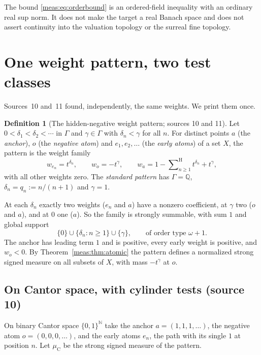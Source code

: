 \documentclass[11pt]{article}
\numberwithin{equation}{section}
\theoremstyle{definition}
\newtheorem{definition}[theorem]{Definition}
\theoremstyle{remark}
\newcommand{\Q}{\mathbb Q}
\newcommand{\N}{\mathbb N}
\newcommand{\hsum}{\mathop{\sum}\nolimits^{\mathrm H}}
\begin{document}
The bound \eqref{meas:eq:orderbound} is an ordered-field inequality with an
ordinary real sup norm. It does not make the target a real Banach space and does
not assert continuity into the valuation topology or the surreal fine
topology.

\section{One weight pattern, two test classes}\label{meas:sec:pattern}

Sources~10 and~11 found, independently, the same weights. We print them once.

\begin{definition}[The hidden-negative weight pattern; sources 10 and 11]
\label{meas:def:pattern}
Let $0<\delta_1<\delta_2<\cdots$ in $\Gamma$ and $\gamma\in\Gamma$ with
$\delta_n<\gamma$ for all $n$. For distinct points $a$ (the \emph{anchor}), $o$
(the \emph{negative atom}) and $e_1,e_2,\ldots$ (the \emph{early atoms}) of a set
$X$, the pattern is the weight family
\begin{equation}\label{meas:eq:pattern}
 w_{e_n}=t^{\delta_n},\qquad w_o=-t^\gamma,\qquad
 w_a=1-\hsum_{n\ge1}t^{\delta_n}+t^\gamma,
\end{equation}
with all other weights zero. The \emph{standard pattern} has $\Gamma=\Q$,
$\delta_n=q_n:=n/(n+1)$ and $\gamma=1$.
\end{definition}

At each $\delta_n$ exactly two weights ($e_n$ and $a$) have a nonzero
coefficient, at $\gamma$ two ($o$ and $a$), and at $0$ one ($a$). So the family is
strongly summable, with sum $1$ and global support
\[
 \{0\}\cup\{\delta_n:n\ge1\}\cup\{\gamma\},\qquad\text{of order type }\omega+1.
\]
The anchor has leading term $1$ and is positive, every early weight is positive,
and $w_o<0$. By Theorem~\ref{meas:thm:atomic} the pattern defines a normalized
strong signed measure on all subsets of $X$, with mass $-t^\gamma$ at $o$.

\subsection{On Cantor space, with cylinder tests (source 10)}

On binary Cantor space $\{0,1\}^{\N}$ take the anchor $a=(1,1,1,\ldots)$, the
negative atom $o=(0,0,0,\ldots)$, and the early atoms $e_n$, the path with its
single $1$ at position $n$. Let $\mu_{\mathrm C}$ be the strong signed measure of
the pattern.
\end{document}
